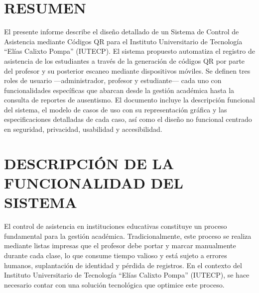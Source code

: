 \documentclass[12pt, letterpaper, oneside]{report}
\begin{document}
\tableofcontents
\newpage

\chapter*{RESUMEN}

El presente informe describe el dise\~no detallado de un Sistema de Control de Asistencia mediante C\'odigos QR para el Instituto Universitario de Tecnolog\'ia ``El\'ias Calixto Pompa'' (IUTECP). El sistema propuesto automatiza el registro de asistencia de los estudiantes a trav\'es de la generaci\'on de c\'odigos QR por parte del profesor y su posterior escaneo mediante dispositivos m\'oviles. Se definen tres roles de usuario ---administrador, profesor y estudiante--- cada uno con funcionalidades espec\'ificas que abarcan desde la gesti\'on acad\'emica hasta la consulta de reportes de ausentismo. El documento incluye la descripci\'on funcional del sistema, el modelo de casos de uso con su representaci\'on gr\'afica y las especificaciones detalladas de cada caso, as\'i como el dise\~no no funcional centrado en seguridad, privacidad, usabilidad y accesibilidad.

\newpage

\pagestyle{body}

\chapter{DESCRIPCI\'ON DE LA FUNCIONALIDAD DEL SISTEMA}

El control de asistencia en instituciones educativas constituye un proceso fundamental para la gesti\'on acad\'emica. Tradicionalmente, este proceso se realiza mediante listas impresas que el profesor debe portar y marcar manualmente durante cada clase, lo que consume tiempo valioso y est\'a sujeto a errores humanos, suplantaci\'on de identidad y p\'erdida de registros. En el contexto del Instituto Universitario de Tecnolog\'ia ``El\'ias Calixto Pompa'' (IUTECP), se hace necesario contar con una soluci\'on tecnol\'ogica que optimice este proceso.
\end{document}
